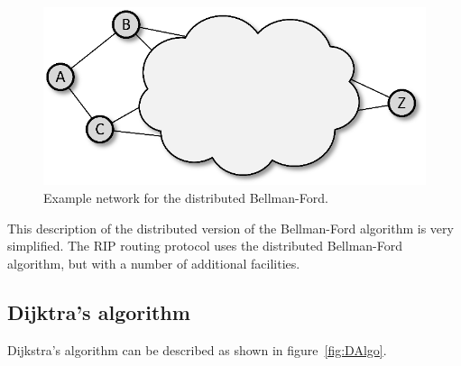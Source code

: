 \documentclass[a4paper]{article}
\begin{document}
\begin{figure}[!ht]
\centering
\includegraphics{dist_bf_ex.eps}
\caption{\label{fig:Dist_BF_Ex}Example network for the distributed
Bellman-Ford.}
\end{figure}

This description of the distributed version of the Bellman-Ford
algorithm is very simplified. The RIP routing protocol uses the
distributed Bellman-Ford algorithm, but with a number of additional
facilities.

\subsection{Dijktra's algorithm}
Dijkstra's algorithm can be described as shown in
figure~\ref{fig:DAlgo}.
\end{document}
